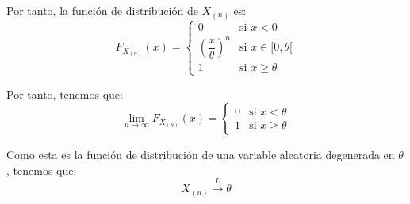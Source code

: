 \documentclass[12pt]{article}
\begin{document}
\begin{ejercicio}[1 punto]
        Por tanto, la función de distribución de $X_{(n)}$ es:
        \begin{equation*}
            F_{X_{(n)}}(x) = \begin{cases}
                0 & \text{si } x<0 \\
                \left(\dfrac{x}{\theta}\right)^n & \text{si } x\in [0,\theta[ \\
                1 & \text{si } x\geq\theta
            \end{cases}
        \end{equation*}

        Por tanto, tenemos que:
        \begin{equation*}
            \lim_{n\to\infty} F_{X_{(n)}}(x) = \begin{cases}
                0 & \text{si } x<\theta\\
                1 & \text{si } x\geq \theta
            \end{cases}
        \end{equation*}

        Como esta es la función de distribución de una variable aleatoria degenerada en $\theta$, tenemos que:
        \begin{equation*}
            X_{(n)}\overset{L}{\longrightarrow} \theta
        \end{equation*}
    \end{ejercicio}
\end{document}
